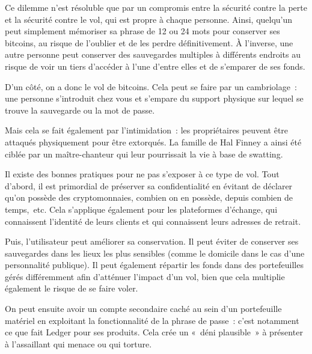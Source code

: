Ce dilemme n'est résoluble que par un compromis entre la sécurité contre la perte et la sécurité contre le vol, qui est propre à chaque personne. Ainsi, quelqu'un peut simplement mémoriser sa phrase de 12 ou 24 mots pour conserver ses bitcoins, au risque de l'oublier et de les perdre définitivement. À l'inverse, une autre personne peut conserver des sauvegardes multiples à différents endroits au risque de voir un tiers d'accéder à l'une d'entre elles et de s'emparer de ses fonds.

D'un côté, on a donc le vol de bitcoins. Cela peut se faire par un cambriolage~: une personne s'introduit chez vous et s'empare du support physique sur lequel se trouve la sauvegarde ou la mot de passe.

Mais cela se fait également par l'intimidation~: les propriétaires peuvent être attaqués physiquement pour être extorqués. La famille de Hal Finney a ainsi été ciblée par un maître-chanteur qui leur pourrissait la vie à base de swatting.

Il existe des bonnes pratiques pour ne pas s'exposer à ce type de vol. Tout d'abord, il est primordial de préserver sa confidentialité en évitant de déclarer qu'on possède des cryptomonnaies, combien on en possède, depuis combien de temps,~etc. Cela s'applique également pour les plateformes d'échange, qui connaissent l'identité de leurs clients et qui connaissent leurs adresses de retrait.

Puis, l'utilisateur peut améliorer sa conservation. Il peut éviter de conserver ses sauvegardes dans les lieux les plus sensibles (comme le domicile dans le cas d'une personnalité publique). Il peut également répartir les fonds dans des portefeuilles gérés différemment afin d'atténuer l'impact d'un vol, bien que cela multiplie également le risque de se faire voler.

On peut ensuite avoir un compte secondaire caché au sein d'un portefeuille matériel en exploitant la fonctionnalité de la phrase de passe~: c'est notamment ce que fait Ledger pour ses produits. Cela crée un «~déni plausible~» à présenter à l'assaillant qui menace ou qui torture.

